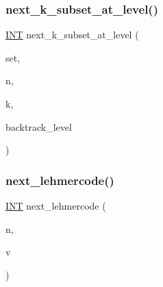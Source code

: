 \mbox{\label{combinatorics_8_c_a4f412bd71048f0975dbaa9ab44b88a3c}} 
\subsubsection{\texorpdfstring{next\+\_\+k\+\_\+subset\+\_\+at\+\_\+level()}{next\_k\_subset\_at\_level()}}
{\footnotesize\ttfamily \mbox{\hyperlink{galois_8h_a09fddde158a3a20bd2dcadb609de11dc}{I\+NT}} next\+\_\+k\+\_\+subset\+\_\+at\+\_\+level (\begin{DoxyParamCaption}\item[{\mbox{\hyperlink{galois_8h_a09fddde158a3a20bd2dcadb609de11dc}{I\+NT}} $\ast$}]{set,  }\item[{\mbox{\hyperlink{galois_8h_a09fddde158a3a20bd2dcadb609de11dc}{I\+NT}}}]{n,  }\item[{\mbox{\hyperlink{galois_8h_a09fddde158a3a20bd2dcadb609de11dc}{I\+NT}}}]{k,  }\item[{\mbox{\hyperlink{galois_8h_a09fddde158a3a20bd2dcadb609de11dc}{I\+NT}}}]{backtrack\+\_\+level }\end{DoxyParamCaption})}

\mbox{\label{combinatorics_8_c_a76b59fcb548de86782e7909ce9951fa3}} 
\subsubsection{\texorpdfstring{next\+\_\+lehmercode()}{next\_lehmercode()}}
{\footnotesize\ttfamily \mbox{\hyperlink{galois_8h_a09fddde158a3a20bd2dcadb609de11dc}{I\+NT}} next\+\_\+lehmercode (\begin{DoxyParamCaption}\item[{\mbox{\hyperlink{galois_8h_a09fddde158a3a20bd2dcadb609de11dc}{I\+NT}}}]{n,  }\item[{\mbox{\hyperlink{galois_8h_a09fddde158a3a20bd2dcadb609de11dc}{I\+NT}} $\ast$}]{v }\end{DoxyParamCaption})}

\mbox{\label{combinatorics_8_c_a01ef309e6a72450dca058893da5e039d}} 
